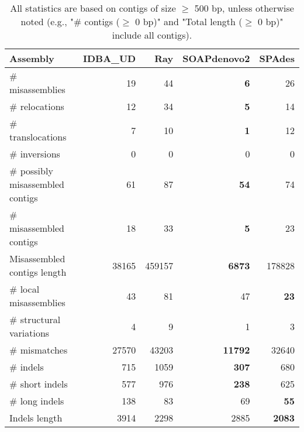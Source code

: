 \documentclass[12pt,a4paper]{article}
\begin{document}
\begin{table}[ht]
\begin{center}
\caption{All statistics are based on contigs of size $\geq$ 500 bp, unless otherwise noted (e.g., "\# contigs ($\geq$ 0 bp)" and "Total length ($\geq$ 0 bp)" include all contigs).}
\begin{tabular}{|l*{4}{|r}|}
\hline
Assembly & IDBA\_UD & Ray & SOAPdenovo2 & SPAdes \\ \hline
\# misassemblies & 19 & 44 & {\bf 6} & 26 \\ \hline
\hspace{5mm}\# relocations & 12 & 34 & {\bf 5} & 14 \\ \hline
\hspace{5mm}\# translocations & 7 & 10 & {\bf 1} & 12 \\ \hline
\hspace{5mm}\# inversions & 0 & 0 & 0 & 0 \\ \hline
\# possibly misassembled contigs & 61 & 87 & {\bf 54} & 74 \\ \hline
\# misassembled contigs & 18 & 33 & {\bf 5} & 23 \\ \hline
Misassembled contigs length & 38165 & 459157 & {\bf 6873} & 178828 \\ \hline
\# local misassemblies & 43 & 81 & 47 & {\bf 23} \\ \hline
\# structural variations & 4 & 9 & 1 & 3 \\ \hline
\# mismatches & 27570 & 43203 & {\bf 11792} & 32640 \\ \hline
\# indels & 715 & 1059 & {\bf 307} & 680 \\ \hline
\hspace{5mm}\# short indels & 577 & 976 & {\bf 238} & 625 \\ \hline
\hspace{5mm}\# long indels & 138 & 83 & 69 & {\bf 55} \\ \hline
Indels length & 3914 & 2298 & 2885 & {\bf 2083} \\ \hline
\end{tabular}
\end{center}
\end{table}
\end{document}
